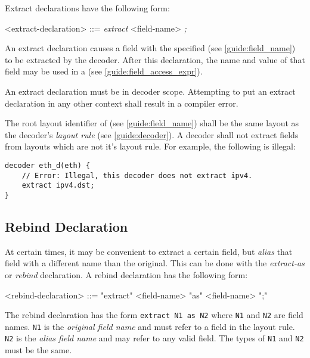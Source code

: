 Extract declarations have the following form:

\begin{grammar}
<extract-declaration> ::=
\textit{extract} <field-name> \textit{;}
\end{grammar}

An extract declaration causes a field with the specified  (see \ref{guide:field_name}) to be extracted by the decoder. After this declaration, the name and value of that field may be used in a  (see \ref{guide:field_access_expr}).

An extract declaration must be in decoder scope. Attempting to put an extract declaration in any other context shall result in a compiler error.

The root layout identifier of  (see \ref{guide:field_name}) shall be the same layout as the decoder's \textit{layout rule} (see \ref{guide:decoder}). A decoder shall not extract fields from layouts which are not it's layout rule. For example, the following is illegal:

\begin{minip}
\begin{lstlisting}
decoder eth_d(eth) {
	// Error: Illegal, this decoder does not extract ipv4.
	extract ipv4.dst; 
}
\end{lstlisting}
\end{minip}

\subsection{Rebind Declaration} \label{guide:rebind}

At certain times, it may be convenient to extract a certain field, but \textit{alias} that field with a different name than the original. This can be done with the \textit{extract-as} or \textit{rebind} declaration. A rebind declaration has the following form:

\begin{minip}
\begin{grammar}
<rebind-declaration> ::=
"extract" <field-name> "as" <field-name> ";"
\end{grammar}
\end{minip}

The rebind declaration has the form \texttt{extract N1 as N2} where \texttt{N1} and \texttt{N2} are field names.
\texttt{N1} is the \textit{original field name} and must refer to a field in the layout rule. \texttt{N2} is the \textit{alias field name} and may refer to any valid field. The types of \texttt{N1} and \texttt{N2} must be the same.


